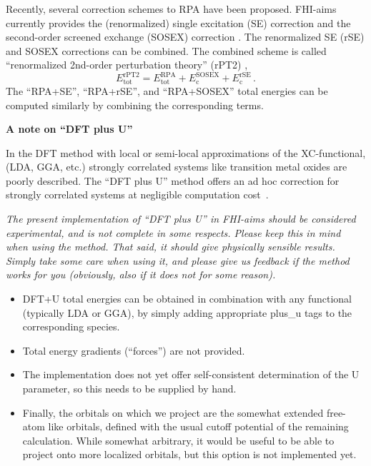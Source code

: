 Recently, several correction schemes to RPA have been proposed. 
FHI-aims currently provides the (renormalized) single excitation (SE) correction
\cite{Ren11} and the second-order screened exchange (SOSEX) correction 
\cite{Grueneis09}. The renormalized SE (rSE) and SOSEX corrections can be combined. The 
combined scheme is called ``renormalized 2nd-order perturbation theory''
(rPT2) \cite{Ren12b},
 \begin{equation}
    E_\text{tot}^\text{rPT2} = E^\text{RPA}_\text{tot} + E^\text{SOSEX}_\text{c} +
         E^\text{rSE}_\text{c}\, .
  \label{eq:rPT2_energy}
 \end{equation}
The ``RPA+SE'', ``RPA+rSE'', and ``RPA+SOSEX'' total energies 
can be computed similarly by combining the corresponding terms.

\textbf{A note on ``DFT plus U''}

In the DFT method with local or semi-local approximations of the
XC-functional, (LDA, GGA, etc.) strongly correlated systems like transition
metal oxides are poorly described. The ``DFT plus U'' method offers an ad hoc
correction for strongly correlated systems at negligible computation 
cost~\cite{Anisimov2000}.

\emph{The present implementation of ``DFT plus U'' in FHI-aims should be
considered experimental, and is not complete in some respects. Please keep
this in mind when using the method. That said, it should give physically
sensible results. Simply take some care when using it, and please give us
feedback if the method works for you (obviously, also if it does not for some
reason).} 
\begin{itemize}
  \item DFT+U total energies can be obtained in combination with any functional
    (typically LDA or GGA), by simply adding appropriate 
    {plus\_u} tags to the corresponding species. 
  \item Total energy gradients (``forces'') are not provided. 
  \item The implementation does not yet offer self-consistent determination of
    the U parameter, so this needs to be supplied by hand.
  \item Finally, the orbitals on which we project are the somewhat extended
    free-atom like orbitals, defined with the usual cutoff potential of the
    remaining calculation. While somewhat arbitrary, it would be useful to be
    able to project onto more localized orbitals, but this option is not
    implemented yet.
\end{itemize}

